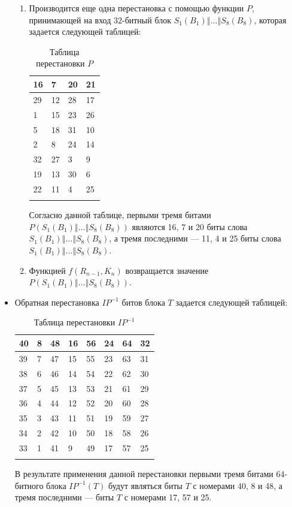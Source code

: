 \documentclass{./civarticle}
\begin{document}
\begin{itemize}
\begin{enumerate}
\item Производится еще одна перестановка с помощью функции $P$, принимающей на вход 32-битный блок $S_1(B_1) \mathbin\Vert ... \mathbin\Vert S_8(B_8)$, которая задается следующей таблицей:

\begin{longtable}{|p{0.5cm}|p{0.5cm}|p{0.5cm}|p{0.5cm}|}
\hline
16 & 7 & 20 & 21 \\
\hline
29 & 12 & 28 & 17 \\
\hline
1 & 15 & 23 & 26 \\
\hline
5 & 18 & 31 & 10 \\
\hline
2 & 8 & 24 & 14 \\
\hline
32 & 27 & 3 & 9 \\
\hline
19 & 13 & 30 & 6 \\
\hline
22 & 11 & 4 & 25 \\
\hline
\caption{Таблица перестановки $P$}
\end{longtable}

Согласно данной таблице, первыми тремя битами $P(S_1(B_1) \mathbin\Vert ... \mathbin\Vert S_8(B_8))$ являются 16, 7 и 20 биты слова $S_1(B_1) \mathbin\Vert ... \mathbin\Vert S_8(B_8)$, а тремя последними --- 11, 4 и 25 биты слова $S_1(B_1) \mathbin\Vert ... \mathbin\Vert S_8(B_8)$.

\item Функцией $f(R_{n-1}, K_n)$ возвращается значение $P(S_1(B_1) \mathbin\Vert ... \mathbin\Vert S_8(B_8))$.
    
\end{enumerate}


\item Обратная перестановка $IP^{-1}$ битов блока $T$ задается следующей таблицей:

\begin{longtable}{|p{0.5cm}|p{0.5cm}|p{0.5cm}|p{0.5cm}|p{0.5cm}|p{0.5cm}|p{0.5cm}|p{0.5cm}|}
\hline
40 & 8 & 48 & 16 & 56 & 24 & 64 & 32 \\
\hline
39 & 7 & 47 & 15 & 55 & 23 & 63 & 31 \\
\hline
38 & 6 & 46 & 14 & 54 & 22 & 62 & 30 \\
\hline
37 & 5 & 45 & 13 & 53 & 21 & 61 & 29 \\
\hline
36 & 4 & 44 & 12 & 52 & 20 & 60 & 28 \\
\hline
35 & 3 & 43 & 11 & 51 & 19 & 59 & 27 \\
\hline
34 & 2 & 42 & 10 & 50 & 18 & 58 & 26 \\
\hline
33 & 1 & 41 & 9 & 49 & 17 & 57 & 25 \\
\hline
\caption{Таблица перестановки $IP^{-1}$}
\end{longtable}

В результате применения данной перестановки первыми тремя битами 64-битного блока $IP^{-1}(T)$ будут являться биты $T$ с номерами 40, 8 и 48, а тремя последними --- биты $T$ с номерами 17, 57 и 25.

\end{itemize}
\end{document}
